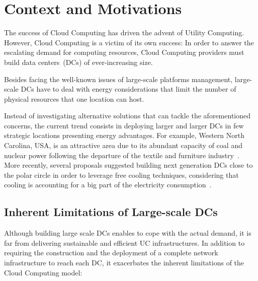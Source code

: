 \section{Context and Motivations}
\label{sec:intro}
The success of Cloud Computing has driven the advent of Utility Computing.
However, Cloud Computing is a victim of its own success: In order to answer the
escalating demand for computing resources, Cloud Computing providers must
build data centers~(DCs) of ever-increasing size.

Besides facing the well-known
issues of large-scale platforms management, large-scale DCs have to deal with
energy considerations that limit the number of physical resources that one
location can host.

Instead of investigating alternative solutions that can tackle the aforementioned 
concerns, the current trend consists in deploying larger and larger DCs in few
strategic locations presenting energy advantages.  For example, Western North
Carolina, USA, is an attractive area due to its abundant capacity of coal
and nuclear power following the departure of the textile and furniture
industry~\cite{greenpeace:2013}.  More recently, several proposals suggested building next
generation DCs close to the polar circle  in order to leverage free cooling
techniques, considering that cooling is accounting for a big part of the
electricity consumption~\cite{greenberg:sigcomm09}. 


\subsection{Inherent Limitations of Large-scale DCs}

Although building large scale DCs  enables to cope with the actual demand,
it is far from delivering sustainable and efficient UC infrastructures.  In addition
to requiring the construction and the deployment of a complete network
infrastructure to reach each DC, it exacerbates the inherent limitations of the
Cloud Computing model:

